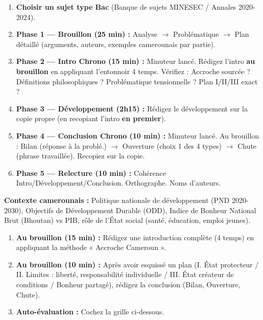 \documentclass[11pt]{article}
\begin{document}
\begin{methode}
\begin{enumerate}
    \item \textbf{Choisir un sujet type Bac} (Banque de sujets MINESEC / Annales 2020-2024).
    \item \textbf{Phase 1 — Brouillon (25 min) :} Analyse $\to$ Problématique $\to$ Plan détaillé (arguments, auteurs, exemples camerounais par partie).
    \item \textbf{Phase 2 — Intro Chrono (15 min) :} Minuteur lancé. Rédigez l'intro \textbf{au brouillon} en appliquant l'entonnoir 4 temps. Vérifiez : Accroche sourcée ? Définitions philosophiques ? Problématique tensionnelle ? Plan I/II/III exact ?
    \item \textbf{Phase 3 — Développement (2h15) :} Rédigez le développement sur la copie propre (en recopiant l'intro \textbf{en premier}).
    \item \textbf{Phase 4 — Conclusion Chrono (10 min) :} Minuteur lancé. Au brouillon : Bilan (réponse à la problé.) $\to$ Ouverture (choix 1 des 4 types) $\to$ Chute (phrase travaillée). Recopiez sur la copie.
    \item \textbf{Phase 5 — Relecture (10 min) :} Cohérence Intro/Développement/Conclusion. Orthographe. Noms d'auteurs.
\end{enumerate}
\end{methode}

\begin{exercice}
\textbf{Contexte camerounais :} Politique nationale de développement (PND 2020-2030), Objectifs de Développement Durable (ODD), Indice de Bonheur National Brut (Bhoutan) vs PIB, rôle de l'État social (santé, éducation, emploi jeunes).
\begin{enumerate}
    \item \textbf{Au brouillon (15 min) :} Rédigez une introduction complète (4 temps) en appliquant la méthode « Accroche Cameroun ».
    \item \textbf{Au brouillon (10 min) :} Après avoir esquissé un plan (I. État protecteur / II. Limites : liberté, responsabilité individuelle / III. État créateur de conditions / Bonheur partagé), rédigez la conclusion (Bilan, Ouverture, Chute).
    \item \textbf{Auto-évaluation :} Cochez la grille ci-dessous.
\end{enumerate}
\end{exercice}
\end{document}
